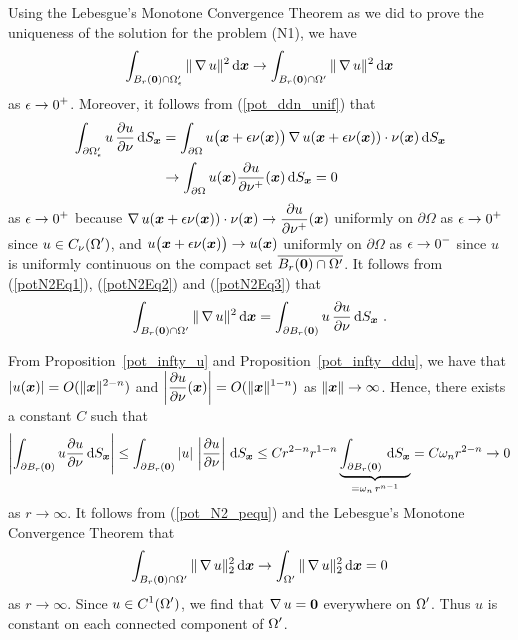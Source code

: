 Using the Lebesgue's Monotone Convergence Theorem as we did to prove
the uniqueness of the solution for the problem (N1), we have
\begin{equation} \label{potN2Eq2}
\int_{B_r({\bm{0}})\cap\Omega^{\prime}_\epsilon} \| \operatorname{\nabla} u \|^2 \,\mathrm{d}{{\bm{x}}}
\rightarrow \int_{B_r({\bm{0}})\cap\Omega^{\prime}} \| \operatorname{\nabla} u \|^2 \,\mathrm{d}{{\bm{x}}}
\end{equation}
as $\displaystyle \epsilon \rightarrow 0^+$.
Moreover, it follows from (\ref{pot_ddn_unif}) that
\begin{equation} \label{potN2Eq3}
\begin{split}
\int_{\partial \Omega^{\prime}_\epsilon} u\,\frac{\partial{u}}{\partial \nu} \,\mathrm{d}{S}_{{\bm{x}}}
&= \int_{\partial \Omega} u\big({\bm{x}} + \epsilon \nu({\bm{x}})\big)
\operatorname{\nabla} u({\bm{x}} + \epsilon \nu({\bm{x}})) \cdot
\nu({\bm{x}}) \,\mathrm{d}{S}_{{\bm{x}}} \\
&\rightarrow \int_{\partial \Omega} u({\bm{x}}) \frac{\partial{u}}{\partial \nu^+}({\bm{x}})
\,\mathrm{d}{S}_{{\bm{x}}} = 0
\end{split}
\end{equation}
as $\displaystyle \epsilon \rightarrow 0^+$ because
$\displaystyle \operatorname{\nabla} u({\bm{x}} + \epsilon \nu({\bm{x}})) \cdot \nu({\bm{x}})
\to \frac{\partial{u}}{\partial \nu^+}({\bm{x}})$ uniformly on $\partial \Omega$ as
$\displaystyle \epsilon \to 0^+$ since
$\displaystyle u \in C_{\nu}(\Omega^{\prime})$, and
$\displaystyle u\big({\bm{x}} + \epsilon \nu({\bm{x}})\big) \to
u({\bm{x}})$ uniformly on $\partial \Omega$ as $\displaystyle \epsilon \to 0^-$
since $u$ is uniformly continuous on the compact set
$\displaystyle \overline{B_r({\bm{0}})\cap\Omega^{\prime}}$.
It follows from (\ref{potN2Eq1}), (\ref{potN2Eq2}) and
(\ref{potN2Eq3}) that 
\begin{equation} \label{pot_N2_pequ}
\int_{B_r({\bm{0}})\cap\Omega^{\prime}} \| \operatorname{\nabla} u \|^2 \,\mathrm{d}{{\bm{x}}} =
\int_{\partial B_r({\bm{0}})} u\,\frac{\partial{u}}{\partial \nu} \,\mathrm{d}{S}_{{\bm{x}}} \  .
\end{equation}

 From Proposition~\ref{pot_infty_u} and
Proposition~\ref{pot_infty_ddu}, we have that
$\displaystyle |u({\bm{x}})| = O(\|{\bm{x}}\|^{2-n})$ and
$\displaystyle \left| \frac{\partial{u}}{\partial \nu}({\bm{x}})\right|
= O(\|{\bm{x}}\|^{1-n})$ as $\|{\bm{x}}\|\rightarrow \infty$.  Hence,
there exists a constant $C$ such that
\[
\left| \int_{\partial B_r({\bm{0}})} u \frac{\partial{u}}{\partial \nu} \,\mathrm{d}{S}_{{\bm{x}}}
\right| \leq
\int_{\partial B_r({\bm{0}})} \left| u \right|\,\left| \frac{\partial{u}}{\partial \nu} \right|
\,\mathrm{d}{S}_{{\bm{x}}}
\leq C r^{2-n} r^{1-n}
\underbrace{\int_{\partial B_r({\bm{0}})} \,\mathrm{d}{S}_{{\bm{x}}}}_{=\omega_n \,r^{n-1}}
= C \omega_n r^{2-n} \rightarrow 0 
\]
as $r \rightarrow \infty$.
It follows from (\ref{pot_N2_pequ}) and the Lebesgue's Monotone
Convergence Theorem that
\[
\int_{B_r({\bm{0}})\cap\Omega^{\prime}} \| \operatorname{\nabla} u \|_2^2 \,\mathrm{d}{{\bm{x}}} \rightarrow
\int_{\Omega^{\prime}} \| \operatorname{\nabla} u \|_2^2 \,\mathrm{d}{{\bm{x}}} = 0
\]
as $r \rightarrow \infty$.
Since $\displaystyle u \in C^1(\Omega^{\prime})$, we find that
$\operatorname{\nabla} u = {\bm{0}}$ everywhere on $\displaystyle \Omega^{\prime}$.
Thus $u$ is constant on each connected component of
$\displaystyle \Omega^{\prime}$.

